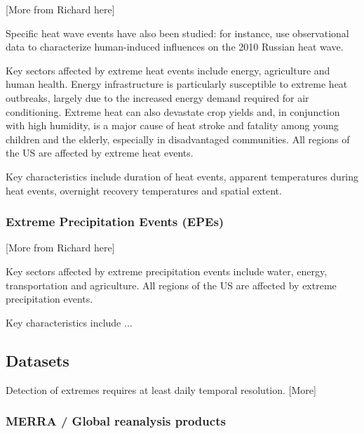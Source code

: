 \documentclass[11pt]{article}
\begin{document}
{\color{red}[More from Richard here]}

Specific heat wave events have also been studied:  for instance, \cite{dole2011grl} use observational data to characterize human-induced influences on the 2010 Russian heat wave.  

Key sectors affected by extreme heat events include energy, agriculture and human health.  Energy infrastructure is particularly susceptible to extreme heat outbreaks, largely due to the increased energy demand required for air conditioning.  Extreme heat can also devastate crop yields and, in conjunction with high humidity, is a major cause of heat stroke and fatality among young children and the elderly, especially in disadvantaged communities.  All regions of the US are affected by extreme heat events.

Key characteristics include duration of heat events, apparent temperatures during heat events, overnight recovery temperatures and spatial extent.

\subsubsection*{Extreme Precipitation Events (EPEs)}

{\color{red}[More from Richard here]}

Key sectors affected by extreme precipitation events include water, energy, transportation and agriculture.  All regions of the US are affected by extreme precipitation events.

Key characteristics include ...


\subsection{Datasets} \label{sec:Datasets}

Detection of extremes requires at least daily temporal resolution. {\color{red} [More]}

\subsubsection*{MERRA / Global reanalysis products} \label{sec:MERRA}
\end{document}
